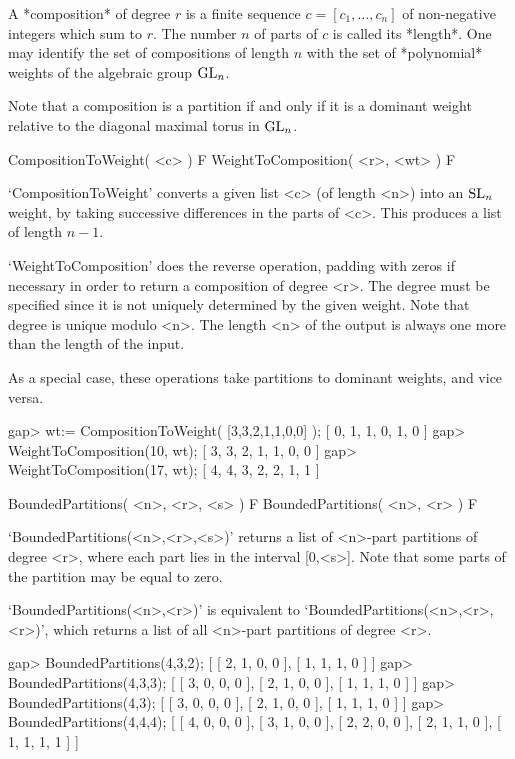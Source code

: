 
A *composition* of degree $r$ is a finite sequence $c = [c_1, \dots,
  c_n]$ of non-negative integers which sum to $r$. The number $n$ of
parts of $c$ is called its *length*. One may identify the set of
compositions of length $n$ with the set of *polynomial* weights of the
algebraic group ${\rm GL}_n$.

Note that a composition is a partition if and only if it is a dominant
weight relative to the diagonal maximal torus in ${\rm GL}_n$. 

\>CompositionToWeight( <c> ) F
\>WeightToComposition( <r>, <wt> ) F

`CompositionToWeight' converts a given list <c> (of length <n>) into
an ${\rm SL}_n$ weight, by taking successive differences in the parts
of <c>. This produces a list of length $n-1$. 

`WeightToComposition' does the reverse operation, padding with zeros
if necessary in order to return a composition of degree <r>. The
degree must be specified since it is not uniquely determined by the
given weight. Note that degree is unique modulo <n>. The length <n> of
the output is always one more than the length of the input.

As a special case, these operations take partitions to dominant
weights, and vice versa.

\beginexample
gap> wt:= CompositionToWeight( [3,3,2,1,1,0,0] );
[ 0, 1, 1, 0, 1, 0 ]
gap> WeightToComposition(10, wt);
[ 3, 3, 2, 1, 1, 0, 0 ]
gap> WeightToComposition(17, wt);
[ 4, 4, 3, 2, 2, 1, 1 ]
\endexample


\>BoundedPartitions( <n>, <r>, <s> ) F
\>BoundedPartitions( <n>, <r> ) F


`BoundedPartitions(<n>,<r>,<s>)' returns a list of <n>-part partitions
of degree <r>, where each part lies in the interval [0,<s>]. Note that
some parts of the partition may be equal to zero.

`BoundedPartitions(<n>,<r>)' is equivalent to
`BoundedPartitions(<n>,<r>,<r>)', which returns a list of all <n>-part
partitions of degree <r>.

\beginexample
gap> BoundedPartitions(4,3,2);           
[ [ 2, 1, 0, 0 ], [ 1, 1, 1, 0 ] ]
gap> BoundedPartitions(4,3,3);
[ [ 3, 0, 0, 0 ], [ 2, 1, 0, 0 ], [ 1, 1, 1, 0 ] ]
gap> BoundedPartitions(4,3);
[ [ 3, 0, 0, 0 ], [ 2, 1, 0, 0 ], [ 1, 1, 1, 0 ] ]
gap> BoundedPartitions(4,4,4);
[ [ 4, 0, 0, 0 ], [ 3, 1, 0, 0 ], [ 2, 2, 0, 0 ], [ 2, 1, 1, 0 ], 
  [ 1, 1, 1, 1 ] ]
\endexample

